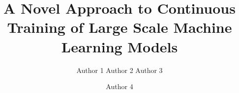 \documentclass{sig-alternate-05-2015}
\begin{document}






%

\title{A Novel Approach to Continuous Training of Large Scale Machine Learning Models}

%
%
%
%
%

%
\author{
%
%
\alignauthor
Author 1
\alignauthor
Author 2
\alignauthor Author 3
\and  %
\alignauthor Author 4
}
\end{document}

